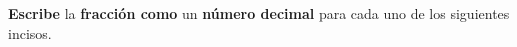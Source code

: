 \question[10] \textbf{Escribe} la \textbf{fracción como} un \textbf{n\'umero decimal} para cada uno de los siguientes incisos.
    \begin{multicols}{3}
        \begin{parts}
            {\printanswers
            
           
            }
            
            {\printanswers
            
            }
            
            {\printanswers
        
            
            }
            
        \end{parts}
        \end{multicols}
